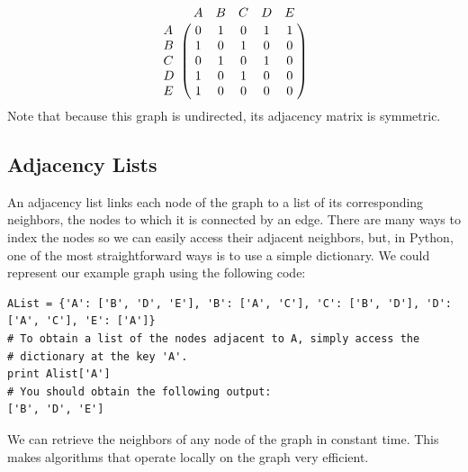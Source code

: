 \[
\bordermatrix{\hspace{.4cm}&A&B&C&D&E\cr
                A&0 & 1 & 0 & 1 & 1\cr
                B& 1 & 0 & 1 & 0 & 0\cr
                C& 0 & 1 & 0 & 1 & 0\cr
                D& 1 & 0 & 1 & 0 & 0\cr
                E& 1 & 0 & 0 & 0 & 0}\]
Note that because this graph is undirected, its adjacency matrix is symmetric.

\subsection*{Adjacency Lists}
An adjacency list links each node of the graph to a list of its corresponding neighbors, the nodes to which it is connected by an edge.
There are many ways to index the nodes so we can easily access their adjacent neighbors, but, in Python, one of the most straightforward ways is to use a simple dictionary.
We could represent our example graph using the following code:
\begin{lstlisting}
AList = {'A': ['B', 'D', 'E'], 'B': ['A', 'C'], 'C': ['B', 'D'], 'D': ['A', 'C'], 'E': ['A']}
# To obtain a list of the nodes adjacent to A, simply access the
# dictionary at the key 'A'.
print Alist['A']
# You should obtain the following output:
['B', 'D', 'E']
\end{lstlisting}
We can retrieve the neighbors of any node of the graph in constant time.
This makes algorithms that operate locally on the graph very efficient.

